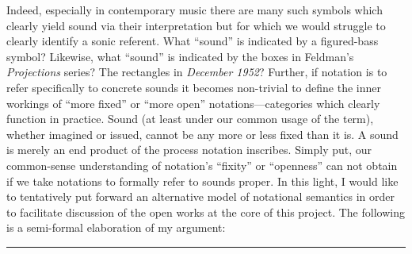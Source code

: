     Indeed, especially in contemporary music there are many such symbols which clearly yield sound via their interpretation but for which we would struggle to clearly identify a sonic referent. What ``sound'' is indicated by a figured-bass symbol? Likewise, what ``sound'' is indicated by the boxes in Feldman's \textit{Projections} series? The rectangles in \textit{December 1952}? Further, if notation is to refer specifically to concrete sounds it becomes non-trivial to define the inner workings of ``more fixed'' or ``more open'' notations---categories which clearly function  in practice. Sound (at least under our common usage of the term), whether imagined or issued, cannot be any more or less fixed than it is. A sound is merely an end product of the process notation inscribes. Simply put, our common-sense understanding of notation's ``fixity'' or ``openness'' can not obtain if we take notations to formally refer to sounds proper. In this light, I would like to tentatively put forward an alternative model of notational semantics in order to facilitate discussion of the open works at the core of this project. The following is a semi-formal elaboration of my argument:


    \begin{center}
    \noindent\rule{3cm}{0.4pt}
    \end{center}   

